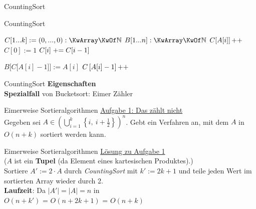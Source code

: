 \begin{frame}{CountingSort}
	\begin{exampleblock}{CountingSort}
		\begin{algorithm}[H]
			\small
			 {
				$C[1...k] := (0,...,0) : \KwArray \KwOf \N$  \;
				$B[1...n] : \KwArray \KwOf \N$  \;
				 {
					$C[A[i]]\operatorname{++}$\;
				}
				$C[0] := 1$\;
				 {
					$C[i] \mathrel{+}= C[i-1]$\;
				}
				
				 {
					$B\Big[C\big[A[i]-1\big]\Big] := A[i]$ 
					$C\left[A[i]-1\right]\operatorname{++}$ 
				}
				\;
			}
		\end{algorithm}
	\end{exampleblock}
\end{frame}

\begin{frame}{CountingSort}
	\textbf{Eigenschaften}  \\
	\impl \textbf{Spezialfall} von Bucketsort: Eimer \entspr Zähler \\
	\pause
	\QuestionVspace
\end{frame}

\begin{frame}{Eimerweise Sortieralgorithmen}
	\underline{Aufgabe 1: Das zählt nicht} \\
	Gegeben sei $ A \in \left( \bigcup\limits_{i=1}^{k} \left\lbrace i,\ i+\frac{1}{2} \right\rbrace\right)^n$. Gebt ein Verfahren an, mit dem $A$ in $O(n + k)$ sortiert werden kann. 
\end{frame}

\begin{frame}{Eimerweise Sortieralgorithmen}
	\underline{Lösung zu Aufgabe 1} \\
	($A$ ist ein \textbf{Tupel} (da Element eines kartesischen Produktes).) \\
	Sortiere $A' := 2 \cdot A$ durch \emph{CountingSort} mit $k' := 2k+1$ und teile jeden Wert im sortierten Array wieder durch 2. \\
	\textbf{Laufzeit}: Da $|A'| = |A| = n$ in \\ 
	$O(n + k')$ = $O(n + 2k+1)$ = $O(n + k)$ 
\end{frame}

